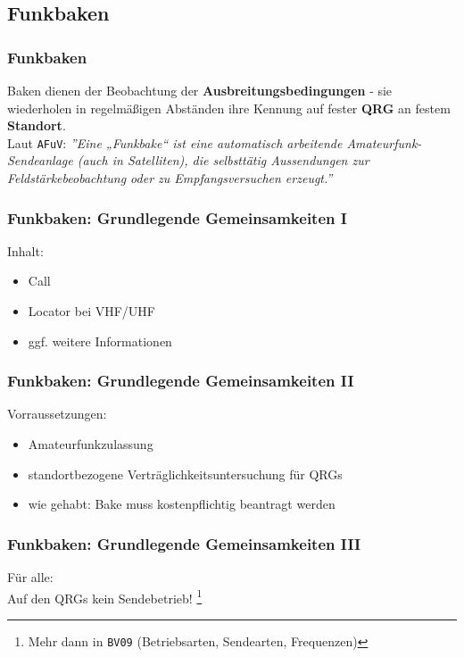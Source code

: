 \subsection{Funkbaken}

\begin{frame}
    \frametitle{Funkbaken}

    Baken dienen der Beobachtung der \textbf{Ausbreitungsbedingungen} - sie
    wiederholen in regelmäßigen Abständen ihre Kennung auf fester \textbf{QRG}
    an festem \textbf{Standort}. \\[2em]

    Laut \texttt{AFuV}: \emph{''Eine „Funkbake“ ist eine automatisch arbeitende
    Amateurfunk-Sendeanlage (auch in Satelliten), die selbsttätig Aussendungen
    zur Feldstärkebeobachtung oder zu Empfangsversuchen erzeugt.''}

\end{frame}

\begin{frame}
    \frametitle{Funkbaken: Grundlegende Gemeinsamkeiten I}

    Inhalt:
    
    \begin{itemize}
        \item Call
        \item Locator bei VHF/UHF
        \item ggf. weitere Informationen
    \end{itemize}

\end{frame}

\begin{frame}
    \frametitle{Funkbaken: Grundlegende Gemeinsamkeiten II}

    Vorraussetzungen:

    \begin{itemize}
        \item Amateurfunkzulassung
        \item standortbezogene Verträglichkeitsuntersuchung für QRGs
        \item wie gehabt: Bake muss kostenpflichtig beantragt werden
    \end{itemize}

\end{frame}

\begin{frame}
    \frametitle{Funkbaken: Grundlegende Gemeinsamkeiten III}

    \begin{center}
        Für alle: \\[2em]
        \Large Auf den QRGs kein Sendebetrieb!
        \footnote{Mehr dann in \texttt{BV09} (Betriebsarten, Sendearten, Frequenzen)}
    \end{center}

\end{frame}

